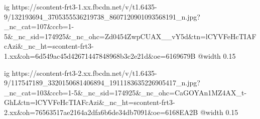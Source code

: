   ig https://scontent-frt3-1.xx.fbcdn.net/v/t1.6435-9/132193694_3705355536219738_8607120901093568191_n.jpg?_nc_cat=107&ccb=1-5&_nc_sid=174925&_nc_ohc=Zd0454ZwpCUAX__vY5d&tn=lCYVFeHcTIAFcAzi&_nc_ht=scontent-frt3-1.xx&oh=6d549ac45d42671447848968b3c2e21d&oe=6169679B
  @width 0.15

  ig https://scontent-frt3-2.xx.fbcdn.net/v/t1.6435-9/117547189_3320150681406894_1911183635226905417_n.jpg?_nc_cat=103&ccb=1-5&_nc_sid=174925&_nc_ohc=CaGOYAn1MZ4AX_t-GhL&tn=lCYVFeHcTIAFcAzi&_nc_ht=scontent-frt3-2.xx&oh=76563517ae2164a2dfa6b6de34db7091&oe=6168EA2B
  @width 0.15
\fi


